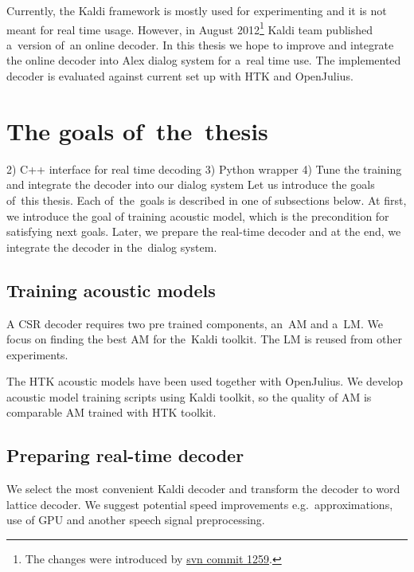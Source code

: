 Currently, the Kaldi framework is mostly used for experimenting and it is not meant for real time usage. 
However, in August 2012\footnote{The changes were introduced 
by \href{https://sourceforge.net/p/kaldi/code/1259/}{svn commit 1259}.} Kaldi team published a~version of~an online decoder. 
In this thesis we hope to improve and integrate the online decoder into Alex dialog system for a~real time use.
The implemented decoder is evaluated against current set up with \ac{HTK} and OpenJulius.


\section{The goals of~the~thesis} 
\label{sec:goals}
2) C++ interface for real time decoding
3) Python wrapper
4) Tune the training and integrate the decoder into our dialog system
Let us introduce the goals of~this thesis. Each of~the~goals is described in one of subsections below.
At first, we introduce the goal of training acoustic model, which is the precondition for satisfying next goals.
Later, we prepare the real-time decoder and at the end, we integrate the decoder in the~dialog system. 

\subsection{Training acoustic models} 
\label{sub:training_kaldi_acoustic_models}
A \acl{CSR} decoder requires two pre trained components, an~\acl{AM} and 
a~\acl{LM}. We focus on finding the best \acl{AM} for the~Kaldi toolkit. 
The \acl{LM} is reused from other experiments.

The \ac{HTK} acoustic models have been used together with OpenJulius. 
We develop acoustic model training scripts using Kaldi toolkit,
so the quality of \ac{AM} is comparable \ac{AM} trained with \ac{HTK} toolkit. 

 

\subsection{Preparing real-time decoder} 
\label{sub:compare_rt}

We select the most convenient Kaldi decoder and transform the decoder to word lattice decoder. 
We suggest potential speed improvements e.g.\ approximations, use of \ac{GPU} and 
another speech signal preprocessing.

